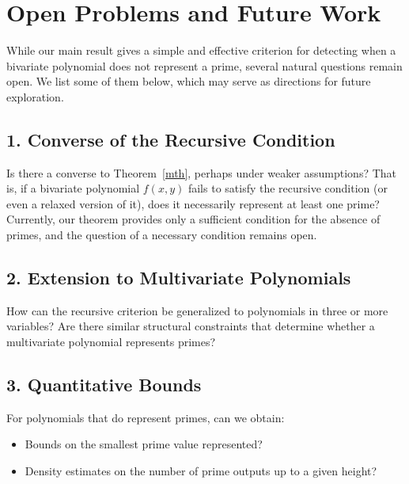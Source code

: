 \documentclass[a4paper,11pt]{article}
\begin{document}
	\section{Open Problems and Future Work}
	
	While our main result gives a simple and effective criterion for detecting when a bivariate polynomial does not represent a prime, several natural questions remain open. We list some of them below, which may serve as directions for future exploration.
	
	\subsection*{1. Converse of the Recursive Condition}
	
	Is there a converse to Theorem~\ref{mth}, perhaps under weaker assumptions? That is, if a bivariate polynomial
	$f(x,y)$ fails to satisfy the recursive condition (or even a relaxed version of it), does it necessarily represent at least one prime? Currently, our theorem provides only a sufficient condition for the absence of primes, and the question of a necessary condition remains open.
	

\subsection*{2. Extension to Multivariate Polynomials}

How can the recursive criterion be generalized to polynomials in three or more variables? Are there similar structural constraints that determine whether a multivariate polynomial represents primes?

\subsection*{3. Quantitative Bounds}

For polynomials that do represent primes, can we obtain:
\begin{itemize}
\item Bounds on the smallest prime value represented?
\item Density estimates on the number of prime outputs up to a given height?
\end{itemize}
\end{document}
